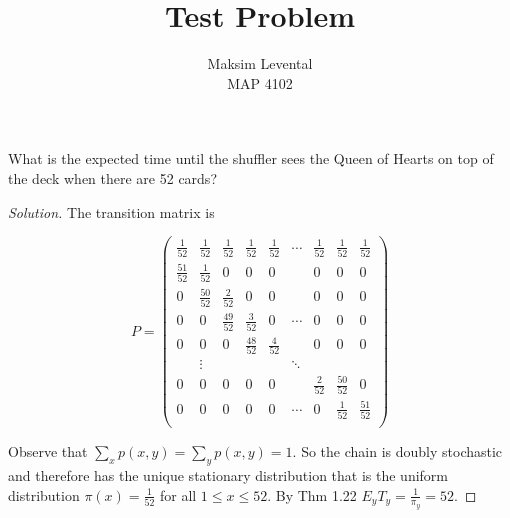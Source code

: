 \documentclass[12pt]{article}
\newenvironment{problem}[2][Problem]{\begin{trivlist}
\item[\hskip \labelsep {\bfseries #1}\hskip \labelsep {\bfseries #2.}]}{\end{trivlist}}
\newenvironment{solution}
  {\begin{proof}[Solution]\renewcommand{\qedsymbol}{}}
  {\end{proof}}
\begin{document}
 
 
\title{Test Problem}%
\author{Maksim Levental\\ %
MAP 4102} %
 
\maketitle
 
\begin{problem}{} %
What is the expected time until the shuffler sees the Queen of Hearts on top of the deck when there are 52 cards?

\end{problem}
 
\begin{solution}

The transition matrix is 

$$ P = \begin{pmatrix} 
\frac{1}{52} & \frac{1}{52} & \frac{1}{52} & \frac{1}{52} & \frac{1}{52} & \cdots & \frac{1}{52}& \frac{1}{52}& \frac{1}{52}\\ 
\frac{51}{52} & \frac{1}{52} & 0 & 0 & 0 && 0 & 0 & 0 \\ 
0& \frac{50}{52} & \frac{2}{52} & 0 & 0&  & 0& 0 & 0 \\ 
0 & 0 & \frac{49}{52} & \frac{3}{52} & 0 & \cdots & 0& 0 & 0 \\ 
0 & 0 & 0 & \frac{48}{52} & \frac{4}{52} & \ & 0& 0 & 0\\
& \vdots & & & &\ddots & \\
0& 0 & 0& 0  &0&&  \frac{2}{52} & \frac{50}{52}&0 \\
0& 0 & 0& 0 &0 & \cdots&0& \frac{1}{52} & \frac{51}{52} \\
\end{pmatrix}
$$

Observe that $\sum_x p(x,y) = \sum_y p(x,y) = 1$. So the chain is doubly stochastic and therefore has the unique stationary distribution that is the uniform distribution $ \pi(x) = \frac{1}{52} $ for all $1 \leqslant x \leqslant 52$. By Thm 1.22 $E_y T_y = \frac{1}{\pi_y} = 52$.



\end{solution}
\end{document}
